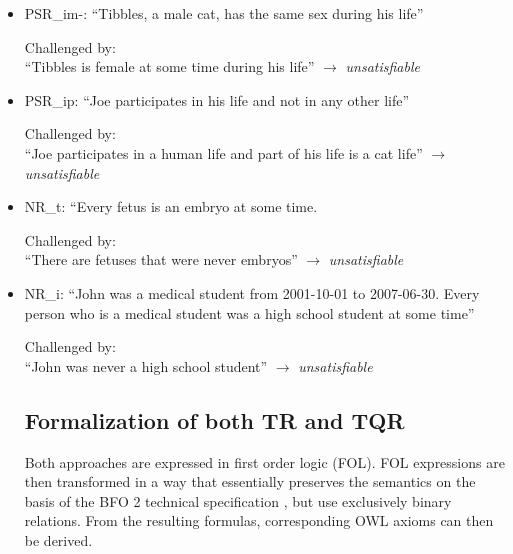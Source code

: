 \begin{itemize}
\item PSR\_im-: ``Tibbles, a male cat, has the same sex during his life'' 

Challenged by: \\``Tibbles is female at some time during his life''  
$\rightarrow$ \emph{unsatisfiable}


\item PSR\_ip: ``Joe participates in his life and not in any other life''

Challenged by: \\``Joe participates in a human life and part of his life is a cat life''  
$\rightarrow$ \emph{unsatisfiable}




\item NR\_t: ``Every fetus is an embryo at some time. 

Challenged by: \\ ``There are fetuses that were never embryos''  
$\rightarrow$ \emph{unsatisfiable}


\item NR\_i: ``John was a medical student from 2001-10-01 to 2007-06-30. Every person who is a medical student was a high school student at some time''

Challenged by: \\ ``John was never a high school student''
 $\rightarrow$ \emph{unsatisfiable}

 
%
%
%
%

\subsection*{Formalization of both TR and TQR}
Both approaches are expressed in first order logic (FOL). FOL expressions are then 
transformed in a way that essentially preserves the semantics on the basis of the BFO 2 technical specification \cite{BFO2:ref}, but  
use exclusively binary relations. From the resulting formulas, corresponding OWL axioms can then be derived.  


\end{itemize}

